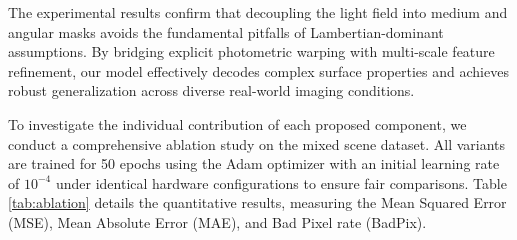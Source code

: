 \documentclass[lettersize,journal]{IEEEtran}
\begin{document}
\begin{table}[t]
\centering
\caption{Quantitative comparison with state-of-the-art methods on three benchmark datasets. The best results are highlighted in \textbf{bold}.}
\label{tab:sota_comparison}
\end{table}

The experimental results confirm that decoupling the light field into medium and angular masks avoids the fundamental pitfalls of Lambertian-dominant assumptions. By bridging explicit photometric warping with multi-scale feature refinement, our model effectively decodes complex surface properties and achieves robust generalization across diverse real-world imaging conditions.

To investigate the individual contribution of each proposed component, we conduct a comprehensive ablation study on the mixed scene dataset. All variants are trained for 50 epochs using the Adam optimizer with an initial learning rate of $10^{-4}$ under identical hardware configurations to ensure fair comparisons. Table \ref{tab:ablation} details the quantitative results, measuring the Mean Squared Error (MSE), Mean Absolute Error (MAE), and Bad Pixel rate (BadPix).
\end{document}

